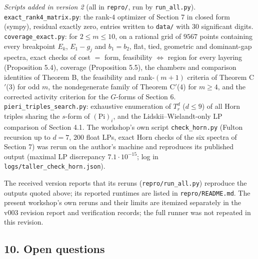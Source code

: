 \documentclass[
  11pt,
  a4paper,
]{article}
\begin{document}
\emph{Scripts added in version 2} (all in {\small\texttt{repro/\allowbreak{}}}, run by
{\small\texttt{run\_\allowbreak{}all.\allowbreak{}py}}). {\small\texttt{exact\_\allowbreak{}rank4\_\allowbreak{}matrix.\allowbreak{}py}}: the rank-\(4\)
optimizer of Section 7 in closed form (sympy), residual exactly zero,
entries written to {\small\texttt{data/\allowbreak{}}} with 30 significant digits.
{\small\texttt{coverage\_\allowbreak{}exact.\allowbreak{}py}}: for \(2\le m\le10\), on a rational grid of
\(9567\) points containing every breakpoint \(E_k\), \(E_1-g_j\) and
\(b_1=b_2\), flat, tied, geometric and dominant-gap spectra, exact
checks of cost \(=\) form, feasibility \(\iff\) region for every
layering (Proposition 5.4), coverage (Proposition 5.5), the chambers and
comparison identities of Theorem B, the feasibility and rank-\((m+1)\)
criteria of Theorem C\('\)(3) for odd \(m\), the nondegenerate family of
Theorem C\('\)(4) for \(m\ge4\), and the corrected activity criterion
for the \(G\)-forms of Section 6. {\small\texttt{pieri\_\allowbreak{}triples\_\allowbreak{}search.\allowbreak{}py}}:
exhaustive enumeration of \(T^d_r\) (\(d\le9\)) of all Horn triples
sharing the \(s\)-form of \((\mathrm{Pi})_i\), and the
Lidskii--Wielandt-only LP comparison of Section 4.1. The workshop's own
script {\small\texttt{check\_\allowbreak{}horn.\allowbreak{}py}} (Fulton recursion up to \(d=7\), \(200\)
float LPs, exact Horn checks of the six spectra of Section 7) was rerun
on the author's machine and reproduces its published output (maximal LP
discrepancy \(7.1\cdot10^{-15}\); log in
{\small\texttt{logs/\allowbreak{}taller\_\allowbreak{}check\_\allowbreak{}horn.\allowbreak{}json}}).

The received version reports that its reruns
({\small\texttt{repro/\allowbreak{}run\_\allowbreak{}all.\allowbreak{}py}}) reproduce the outputs quoted above; its
reported runtimes are listed in {\small\texttt{repro/\allowbreak{}README.\allowbreak{}md}}. The present
workshop's own reruns and their limits are itemized separately in the
v003 revision report and verification records; the full runner was not
repeated in this revision.

\subsection{10. Open questions}\label{open-questions}
\end{document}
